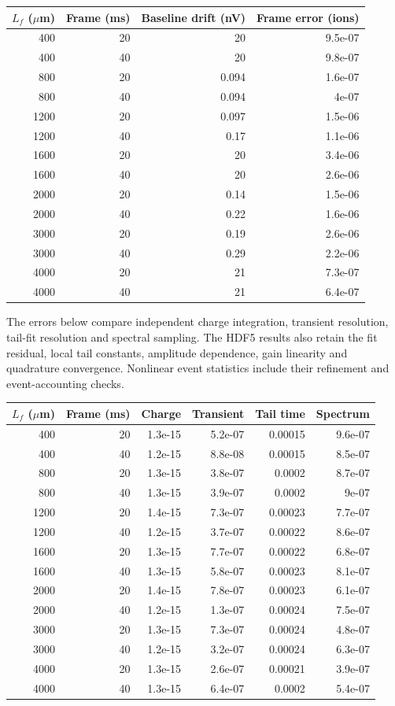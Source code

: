 \documentclass[10pt,a4paper]{article}
\begin{document}
\begin{center}\small\begin{longtable}{rrrr}\toprule
$L_f$ ($\mu$m) & Frame (ms) & Baseline drift (nV) & Frame error (ions)\\\midrule
400 & 20 & 20 & 9.5e-07 \\
400 & 40 & 20 & 9.8e-07 \\
800 & 20 & 0.094 & 1.6e-07 \\
800 & 40 & 0.094 & 4e-07 \\
1200 & 20 & 0.097 & 1.5e-06 \\
1200 & 40 & 0.17 & 1.1e-06 \\
1600 & 20 & 20 & 3.4e-06 \\
1600 & 40 & 20 & 2.6e-06 \\
2000 & 20 & 0.14 & 1.5e-06 \\
2000 & 40 & 0.22 & 1.6e-06 \\
3000 & 20 & 0.19 & 2.6e-06 \\
3000 & 40 & 0.29 & 2.2e-06 \\
4000 & 20 & 21 & 7.3e-07 \\
4000 & 40 & 21 & 6.4e-07 \\
\bottomrule\end{longtable}\end{center}

The errors below compare independent charge integration, transient resolution,
tail-fit resolution and spectral sampling. The HDF5 results also retain the
fit residual, local tail constants, amplitude dependence, gain linearity and
quadrature convergence. Nonlinear event statistics include their refinement
and event-accounting checks.
\begin{center}\scriptsize\begin{longtable}{rrrrrr}\toprule
$L_f$ ($\mu$m) & Frame (ms) & Charge & Transient & Tail time & Spectrum\\\midrule
400 & 20 & 1.3e-15 & 5.2e-07 & 0.00015 & 9.6e-07 \\
400 & 40 & 1.2e-15 & 8.8e-08 & 0.00015 & 8.5e-07 \\
800 & 20 & 1.3e-15 & 3.8e-07 & 0.0002 & 8.7e-07 \\
800 & 40 & 1.3e-15 & 3.9e-07 & 0.0002 & 9e-07 \\
1200 & 20 & 1.4e-15 & 7.3e-07 & 0.00023 & 7.7e-07 \\
1200 & 40 & 1.2e-15 & 3.7e-07 & 0.00022 & 8.6e-07 \\
1600 & 20 & 1.3e-15 & 7.7e-07 & 0.00022 & 6.8e-07 \\
1600 & 40 & 1.3e-15 & 5.8e-07 & 0.00023 & 8.1e-07 \\
2000 & 20 & 1.4e-15 & 7.8e-07 & 0.00023 & 6.1e-07 \\
2000 & 40 & 1.2e-15 & 1.3e-07 & 0.00024 & 7.5e-07 \\
3000 & 20 & 1.3e-15 & 7.3e-07 & 0.00024 & 4.8e-07 \\
3000 & 40 & 1.2e-15 & 3.2e-07 & 0.00024 & 6.3e-07 \\
4000 & 20 & 1.3e-15 & 2.6e-07 & 0.00021 & 3.9e-07 \\
4000 & 40 & 1.3e-15 & 6.4e-07 & 0.0002 & 5.4e-07 \\
\bottomrule\end{longtable}\end{center}
\end{document}
